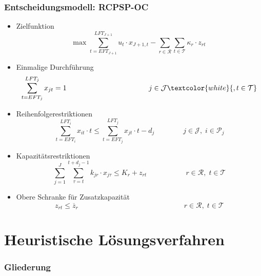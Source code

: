 
\begin{frame}
	\frametitle{Entscheidungsmodell: RCPSP-OC}
	\begin{footnotesize}
		\begin{itemize}
			\item Zielfunktion\\[-7mm]
			\[
			\mbox{max } \sum_{t=EFT_{J+1}}^{LFT_{J+1}} u_t \cdot x_{{J+1},t} - \sum_{r \in \mathcal{R}} \sum_{t \in \mathcal{T}} \kappa_r \cdot z_{rt}
			\]
			
			\item Einmalige Durchführung
			\[
			\sum_{t=EFT_j}^{LFT_j} x_{jt} = 1 \,\,\,\quad\quad\quad\quad\quad\quad\quad\quad\quad\quad\quad j \in \mathcal{J}\textcolor{white}{, t \in \mathcal{T}}
			\]
			
			\item Reihenfolgerestriktionen
			\[
			\sum_{t=EFT_i}^{LFT_i} x_{it} \cdot t \leq \sum_{t=EFT_j}^{LFT_j} x_{jt} \cdot t - d_j \,\,\:\:\:\quad\quad\quad j \in \mathcal{J}, \; i \in \mathcal{P}_j
			\]
			
			\item Kapazitätsrestriktionen
			\[
			\sum_{j=1}^{J} \sum_{\tau=t}^{t+d_j-1} k_{jr} \cdot x_{j\tau} \leq K_r + z_{rt} \,\,\:\:\:\:\:\quad\quad\quad\quad r \in \mathcal{R}, \; t \in \mathcal{T}
			\]
			
			\item Obere Schranke für Zusatzkapazität\\[-3mm]
			\[
			z_{rt} \leq \overline{z}_r \,\;\;\quad\quad\quad\quad\quad\quad\quad\quad\quad\quad\quad\quad\quad\quad r \in \mathcal{R}, \; t \in \mathcal{T}
			\]
		\end{itemize}
	\end{footnotesize}
\end{frame}


\section{Heuristische Lösungsverfahren}

\begin{frame}[noframenumbering]
\frametitle{Gliederung}
\end{frame}

